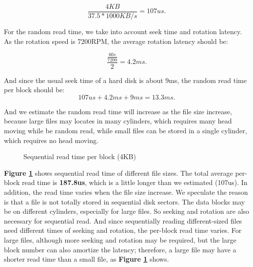$$\frac{4KB}{37.5*1000KB/s} = 107us.$$

For the random read time, we take into account seek time and rotation latency. As the rotation speed is 7200RPM, the average rotation latency should be:

$$ \frac{\frac{60s}{7200}}{2} = 4.2ms.$$

And since the usual seek time of a hard disk is about 9ms, the random read time per block should be:
$$ 107us + 4.2ms + 9ms = 13.3ms. $$

And we estimate the random read time will increase as the file size increase, because large files may locates in many cylinders, which requires many head moving while be random read, while small files can be stored in a single cylinder, which requires no head moving.

\begin{figure}[ht]
    \centering
    \caption{Sequential read time per block (4KB)}
    \label{seq_read_time}
\end{figure}

\textbf{Figure \ref{seq_read_time}} shows sequential read time of different file sizes. The total average per-block read time is \textbf{187.8us}, which is a little longer than we estimated (107us). In addition, the read time varies when the file size increase. We speculate the reason is that a file is not totally stored in sequential disk sectors. The data blocks may be on different cylinders, especially for large files. So seeking and rotation are also necessary for
sequential read. And since sequentially reading different-sized files need different times of seeking and rotation, the per-block read time varies. For large files, although more seeking and rotation may be required, but the large block number can also amortize the latency; therefore, a large file may have a shorter read time than a small file, as \textbf{Figure \ref{seq_read_time}} shows.


